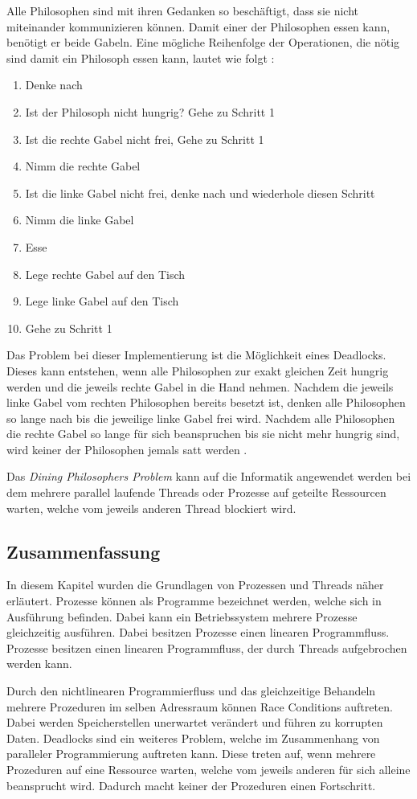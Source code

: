 Alle Philosophen sind mit ihren Gedanken so beschäftigt, dass sie nicht miteinander kommunizieren können. Damit einer der Philosophen essen kann, benötigt er beide Gabeln. Eine mögliche Reihenfolge der Operationen, die nötig sind damit ein Philosoph essen kann, lautet wie folgt \cite[p. 21]{dij71}:

\begin{enumerate}
  \item Denke nach
  \item Ist der Philosoph nicht hungrig? Gehe zu Schritt 1
  \item Ist die rechte Gabel nicht frei, Gehe zu Schritt 1
  \item Nimm die rechte Gabel
  \item Ist die linke Gabel nicht frei, denke nach und wiederhole diesen Schritt
  \item Nimm die linke Gabel
  \item Esse
  \item Lege rechte Gabel auf den Tisch  
  \item Lege linke Gabel auf den Tisch
  \item Gehe zu Schritt 1
\end{enumerate}

Das Problem bei dieser Implementierung ist die Möglichkeit eines Deadlocks. Dieses kann entstehen, wenn alle Philosophen zur exakt gleichen Zeit hungrig werden und die jeweils rechte Gabel in die Hand nehmen. Nachdem die jeweils linke Gabel vom rechten Philosophen bereits besetzt ist, denken alle Philosophen so lange nach bis die jeweilige linke Gabel frei wird. Nachdem alle Philosophen die rechte Gabel so lange für sich beanspruchen bis sie nicht mehr hungrig sind, wird keiner der Philosophen jemals satt werden \cite[p. 21]{dij71}. 

Das \emph{Dining Philosophers Problem} kann auf die Informatik angewendet werden bei dem mehrere parallel laufende Threads oder Prozesse auf geteilte Ressourcen warten, welche vom jeweils anderen Thread blockiert wird.

\subsection{Zusammenfassung}
In diesem Kapitel wurden die Grundlagen von Prozessen und Threads näher erläutert. Prozesse können als Programme bezeichnet werden, welche sich in Ausführung befinden. Dabei kann ein Betriebssystem mehrere Prozesse gleichzeitig ausführen. Dabei besitzen Prozesse einen linearen Programmfluss. Prozesse besitzen einen linearen Programmfluss, der durch Threads aufgebrochen werden kann.

Durch den nichtlinearen Programmierfluss und das gleichzeitige Behandeln mehrere Prozeduren im selben Adressraum können Race Conditions auftreten. Dabei werden Speicherstellen unerwartet verändert und führen zu korrupten Daten. Deadlocks sind ein weiteres Problem, welche im Zusammenhang von paralleler Programmierung auftreten kann. Diese treten auf, wenn mehrere Prozeduren auf eine Ressource warten, welche vom jeweils anderen für sich alleine beansprucht wird. Dadurch macht keiner der Prozeduren einen Fortschritt.